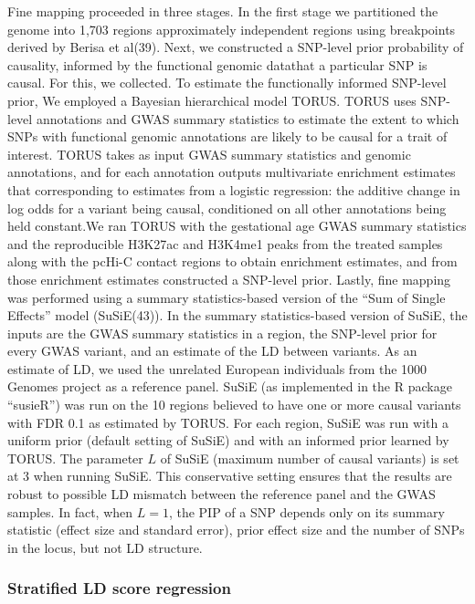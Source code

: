 Fine mapping proceeded in three stages. In the first stage we partitioned the genome into 1,703 regions approximately independent regions using breakpoints derived by Berisa et al(39).
 Next, we constructed a SNP-level prior probability of causality, informed by the functional genomic datathat a particular SNP is causal. For this, we collected. 
To estimate the functionally informed SNP-level prior, We employed a Bayesian hierarchical model TORUS\cite{torus}.  
TORUS uses SNP-level annotations and GWAS summary statistics to estimate the extent to which SNPs with functional genomic annotations are likely to be causal for a trait of interest.  
TORUS takes as input GWAS summary statistics and genomic annotations, and for each annotation outputs multivariate enrichment estimates that corresponding to estimates from a logistic regression: 
the additive change in log odds for a variant being causal, conditioned on all other annotations being held constant.We ran TORUS with the gestational age GWAS summary statistics and the reproducible
H3K27ac and H3K4me1 peaks from the treated samples along with the pcHi-C contact regions to obtain enrichment estimates, and from those enrichment estimates constructed a SNP-level prior. Lastly, fine
mapping was performed using a summary statistics-based version of the “Sum of Single Effects” model (SuSiE(43)).  
In the summary statistics-based version of SuSiE, the inputs are the GWAS summary statistics in a region, the SNP-level prior for every GWAS variant, and an estimate of the LD between variants. 
As an estimate of LD, we used the unrelated European individuals from the 1000 Genomes project as a reference panel. SuSiE (as implemented in the R package “susieR”) was run on the 10 regions 
believed to have one or more causal variants with FDR 0.1 as estimated by TORUS. For each region, SuSiE was run with a uniform prior (default setting of SuSiE) and with an informed prior learned 
by TORUS. The parameter $L$ of SuSiE (maximum number of causal variants) is set at 3 when running SuSiE. This conservative setting ensures that the results are robust to possible LD mismatch between 
the reference panel and the GWAS samples. In fact, when $L = 1$, the PIP of a SNP depends only on its summary statistic (effect size and standard error), prior effect size and the number of SNPs in the locus, 
but not LD structure.  


\subsubsection{Stratified LD score regression}\label{sec:org3173e32}

